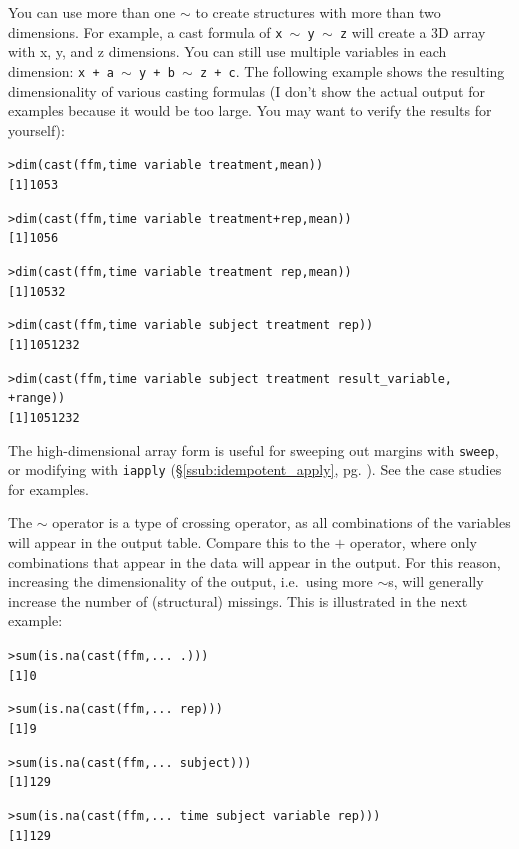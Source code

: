 \documentclass[oneside,letterpaper]{scrartcl}
\newcommand{\secref}[1]{\S \ref{#1}, pg. \pageref{#1}}
\begin{document}
You can use more than one $\sim$ to create structures with more than two dimensions.  For example, a cast formula of {\tt x $\sim$ y $\sim$ z} will create a 3D array with x, y, and z dimensions. You can still use multiple variables in each dimension: {\tt x + a $\sim$ y + b $\sim$ z + c}.  The following example shows the resulting dimensionality of various casting formulas (I don't show the actual output for examples because it would be too large.  You may want to verify the results for yourself):

\begin{alltt}
> dim(cast(ffm, time ~ variable ~ treatment, mean))
[1] 10  5  3

> dim(cast(ffm, time ~ variable ~ treatment + rep, mean))
[1] 10  5  6

> dim(cast(ffm, time ~ variable ~ treatment ~ rep, mean))
[1] 10  5  3  2

> dim(cast(ffm, time ~ variable ~ subject ~ treatment ~ rep))
[1] 10  5 12  3  2

> dim(cast(ffm, time ~ variable ~ subject ~ treatment ~ result_variable, 
+     range))
[1] 10  5 12  3  2

\end{alltt}

The high-dimensional array form is useful for sweeping out margins with {\tt sweep}, or modifying with {\tt iapply} (\secref{ssub:idempotent_apply}).  See the case studies for examples.  

The $\sim$ operator is a type of crossing operator, as all combinations of the variables will appear in the output table.   Compare this to the $+$ operator, where only combinations that appear in the data will appear in the output.  For this reason, increasing the dimensionality of the output, i.e.\ using more $\sim$s, will generally increase the number of (structural) missings.  This is illustrated in the next example:

\begin{alltt}
> sum(is.na(cast(ffm, ... ~ .)))
[1] 0

> sum(is.na(cast(ffm, ... ~ rep)))
[1] 9

> sum(is.na(cast(ffm, ... ~ subject)))
[1] 129

> sum(is.na(cast(ffm, ... ~ time ~ subject ~ variable ~ rep)))
[1] 129

\end{alltt}
\end{document}
